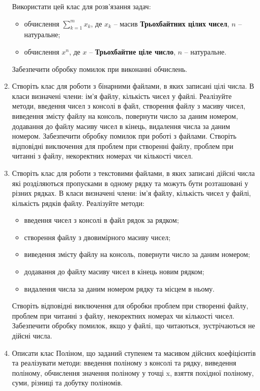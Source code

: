 \documentclass[a5paper,titlepage,openany,twoside,
]
{book_unv}%
\begin{document}
\begin{enumerate}
Використати цей клас для розв'язання задач:
\begin{itemize}
\item
обчислення $\sum\limits_{k=1}^{m} x_{k}$, де $x_k$ -- масив \textbf{Трьохбайтних цілих чисел}, $n$ -- натуральне;
\item
обчислення $x^{n} $, де $x$ -- \textbf{Трьохбайтне ціле число}, $n$ -- натуральне.
\end{itemize}
Забезпечити обробку помилок при виконанні обчислень.


\item
Створіть клас для роботи з бінарними файлами, в яких записані цілі числа.
В класи визначені члени: ім'я файлу, кількість чисел у файлі.
Реалізуйте методи, введення чисел з консолі в файл, створення файлу з масиву чисел,
виведення змісту файлу на консоль, повернути число за даним номером, 
додавання до файлу масиву чисел в кінець, видалення числа за даним номером.
Забезпечити обробку помилок при роботі з файлами. 
Створіть відповідні виключення для проблем при створенні файлу,
проблем при читанні з файлу, некоректних номерах чи кількості чисел. 

\item
Створіть клас для роботи з текстовими файлами, в яких записані дійсні числа
які розділяються пропусками в одному рядку та можуть бути розташовані у
різних рядках.
В класи визначені члени: ім'я файлу, кількість чисел у файлі, кількість рядків файлу.
Реалізуйте методи:
\begin{itemize}
\item
введення чисел з консолі в файл рядок за рядком;
\item
створення файлу з двовимірного масиву чисел;
\item
виведення змісту файлу на консоль, повернути число за даним номером; 
\item
додавання до файлу масиву чисел в кінець новим рядком; 
\item
видалення числа за даним номером рядку та місцем в ньому.
\end{itemize}

Створіть відповідні виключення для обробки проблем при створенні файлу,
проблем при читанні з файлу, некоректних номерах чи кількості чисел.
Забезпечити обробку помилок, якщо у файлі, що читаються, 
зустрічаються не дійсні числа.

\item

Описати клас Поліном, що заданий ступенем та масивом дійсних коефіцієнтів
та реалізувати методи: введення поліному з консолі та рядку,
виведення поліному, обчислення значення поліному у точці x, взяття
похідної поліному, суми, різниці та добутку поліномів.


\end{enumerate}
\end{document}
